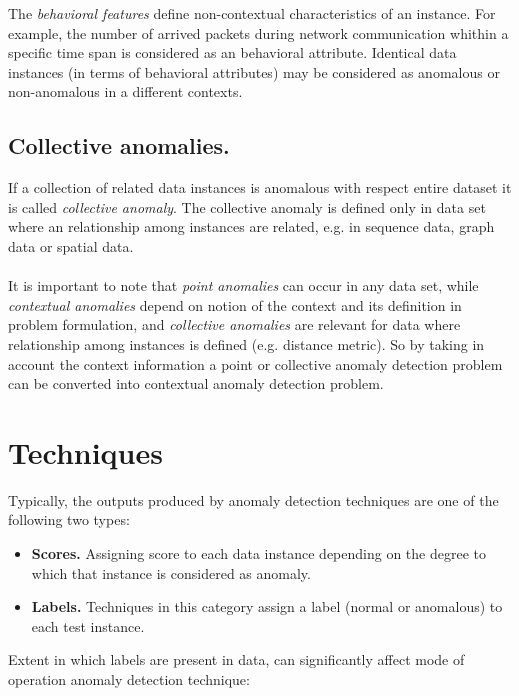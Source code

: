 The \emph{behavioral features} define non-contextual characteristics of an instance. For example, 
the number of arrived packets during network communication whithin a specific time span is considered 
as an behavioral attribute. Identical data instances (in terms of behavioral attributes) 
may be considered as anomalous or non-anomalous in a different contexts.


\subsection{Collective anomalies.} If a collection of related data instances is anomalous with respect
entire dataset it is called \emph{collective anomaly}. The collective anomaly is defined only 
in data set where an relationship among instances are related, e.g. in sequence data, graph data or
spatial data.

\paragraph*{}
It is important to note that \emph{point anomalies} can occur in any data set, while 
\emph{contextual anomalies} depend on notion of the context and its definition in problem formulation, 
and \emph{collective anomalies} are relevant for data where relationship among instances is defined
(e.g. distance metric). So by taking in account the context information a point or collective anomaly
detection problem can be converted into contextual anomaly detection problem.

\section{Techniques}

Typically, the outputs produced by anomaly detection techniques are one of the following two types:
\begin{itemize}
	\item \textbf{Scores.} Assigning score to each data instance depending on the degree to which 
	that instance is considered as anomaly.
	\item \textbf{Labels.} Techniques in this category assign a label (normal or anomalous) to 
	each test instance.
\end{itemize}



Extent in which labels are present in data, can significantly affect mode of operation 
anomaly detection technique:


